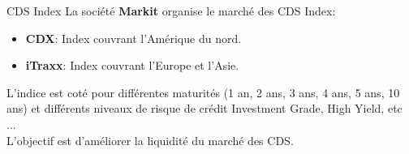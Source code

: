 \documentclass{beamer}
\begin{document}
\begin{frame}{CDS Index}
La société \textbf{Markit} organise le marché des CDS Index:\\
\begin{itemize}
\item \textbf{CDX}: Index couvrant l'Amérique du nord.
\item \textbf{iTraxx}: Index couvrant l'Europe et l'Asie.
\end{itemize}
\vspace{0.5cm}
L'indice est coté pour différentes maturités (1 an, 2 ans, 3 ans, 4 ans, 5 ans, 10 ans) et différents niveaux de risque de crédit Investment Grade, High Yield, etc ...\\
\vspace{0.5cm}
L'objectif est d'améliorer la liquidité du marché des CDS.
\end{frame}
\end{document}
